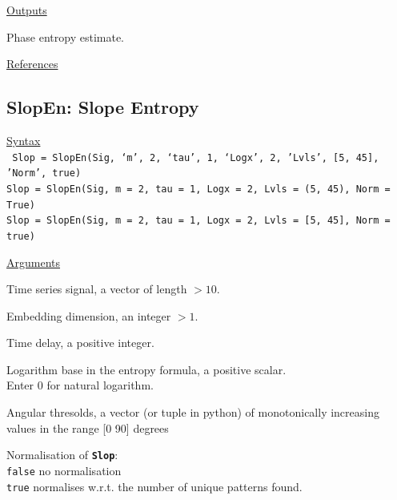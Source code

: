 \documentclass[12pt, a4paper, titlepage, openany]{book}
\begin{document}
\noindent \ul{Outputs}
\begin{description}[labelsep=1cm, labelwidth=2cm, nosep, style=multiline,leftmargin=3cm]\footnotesize
\item[\texttt{Phas}]	Phase entropy estimate.
\end{description}

\noindent \ul{References}\hspace{1cm}
\cite{Phas1}



\newpage
\subsection{\normalsize SlopEn: \hspace{15mm} Slope Entropy}
\noindent\ul{Syntax} \vspace{6mm} \\ \noindent \texttt{\footnotesize
Slop = SlopEn(Sig, ‘m’, 2, ‘tau’, 1, ‘Logx’, 2, 'Lvls', [5, 45], 'Norm', true) \\
Slop = SlopEn(Sig, m = 2, tau = 1, Logx = 2, Lvls = (5, 45), Norm = True) \\
Slop = SlopEn(Sig, m = 2, tau = 1, Logx = 2, Lvls = [5, 45], Norm = true)}

\noindent \ul{Arguments}
\begin{description}[labelsep=1cm, labelwidth=2cm, nosep, style=multiline,leftmargin=3cm]\footnotesize
\item[\texttt{Sig}]		Time series signal, a vector of length $> 10$.
\item[\texttt{m}]		Embedding dimension, an integer $> 1$.
\item[\texttt{tau}]		Time delay, a positive integer.
\item[\texttt{Logx}]	Logarithm base in the entropy formula, a positive scalar.\\
			Enter 0 for natural logarithm.
\item[\texttt{Lvls}]	Angular thresolds, a vector (or tuple in python) of monotonically increasing   
              values in the range [0 90] degrees
\item[\texttt{Norm}]	Normalisation of \texttt{\textbf{Slop}}:\\
						\texttt{false} \hspace{10pt} no normalisation \\
						\texttt{true} \hspace{15pt} normalises w.r.t. the number of unique patterns found.
\end{description}
\end{document}
